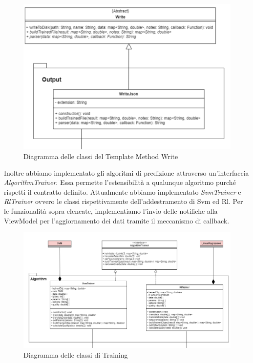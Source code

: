 			\mbox{}
			\begin{figure} [H]
				\includegraphics[width=\linewidth]{./img/Diagrammi/write.png}
				\caption{Diagramma delle classi del Template Method Write}
			\end{figure}
			Inoltre abbiamo implementato gli algoritmi di predizione attraverso un'interfaccia \textit{AlgorithmTrainer}. Essa permette l'estensibilità a qualunque algoritmo purché rispetti il contratto definito. Attualmente abbiamo implementato \textit{SvmTrainer} e \textit{RlTrainer} ovvero le classi rispettivamente dell'addestramento di Svm ed Rl.
			Per le funzionalità sopra elencate, implementiamo l'invio delle notifiche alla ViewModel per l'aggiornamento dei dati tramite il meccanismo di callback.
			\mbox{}
			\begin{figure} [H]
				\includegraphics[width=\linewidth]{./img/Diagrammi/Training.png}
				\caption{Diagramma delle classi di Training}
			\end{figure}			
